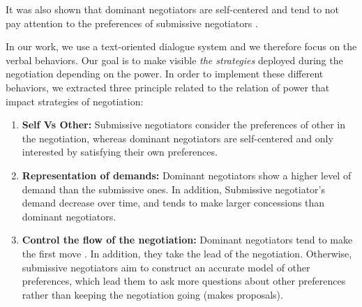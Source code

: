 \documentclass{llncs}
\begin{document}
	It was also shown that dominant negotiators are self-centered and tend to not pay attention to the preferences of submissive negotiators \cite{fiske1993controlling,de1995impact}.

	In our work, we use a text-oriented dialogue system and we therefore focus on the verbal behaviors.  Our goal is to make visible \emph{the strategies} deployed during the negotiation depending on the power. In order to implement these different behaviors, we extracted three principle related to the relation of power that impact strategies of negotiation:
	\begin{enumerate}
	\item \textbf{Self Vs Other:} Submissive negotiators consider the preferences of other in the negotiation, whereas dominant negotiators  are self-centered and only interested by satisfying their own preferences. \cite{fiske1993controlling,de1995impact}
	
	\item \textbf{Representation of demands:} Dominant negotiators show a higher level of demand than the submissive ones. In addition,  Submissive negotiator's demand decrease over time, and tends to make larger concessions than dominant negotiators. \cite{de1995impact}
	
	\item \textbf{Control the flow of the negotiation:}
	Dominant negotiators tend to make the first move \cite{magee2007power}. In addition, they take the lead of the negotiation. Otherwise, submissive negotiators aim to construct an accurate model of other preferences, which lead them to ask more questions about other preferences rather than keeping the negotiation going (makes proposals). \cite{de2004influence}
	
	\end{enumerate}
	
\end{document}
